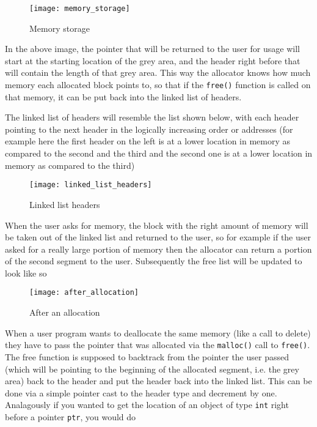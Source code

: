 \documentclass{article}
\begin{document}
\begin{figure}[!htb]
\centering
\texttt{[image: memory\_storage]}
\caption{Memory storage}
\end{figure}

In the above image, the pointer that will be returned to the user for usage
will start at the starting location of the grey area, and the header right
before that will contain the length of that grey area.  This way the allocator
knows how much memory each allocated block points to, so that if the
\texttt{free()} function is called on that memory, it can be put back into the
linked list of headers.

The linked list of headers will resemble the list shown below, with each
header pointing to the next header in the logically increasing order or
addresses (for example here the first header on the left is at a lower
location in memory as compared to the second and the third and the second one
is at a lower location in memory as compared to the third)

\begin{figure}[!htb]
\centering
\texttt{[image: linked\_list\_headers]}
\caption{Linked list headers}
\end{figure}

When the user asks for memory, the block with the right amount of memory will
be taken out of the linked list and returned to the user, so for example if
the user asked for a really large portion of memory then the allocator can
return a portion of the second segment to the user.  Subsequently the free
list will be updated to look like so

\begin{figure}[!htb]
\centering
\texttt{[image: after\_allocation]}
\caption{After an allocation}
\end{figure}

When a user program wants to deallocate the same memory (like a call to
delete) they have to pass the pointer that was allocated via the
\texttt{malloc()} call to \texttt{free()}.  The free function is supposed to
backtrack from the pointer the user passed (which will be pointing to the
beginning of the allocated segment, i.e.  the grey area) back to the header
and put the header back into the linked list.  This can be done via a simple
pointer cast to the header type and decrement by one.  Analagously if you
wanted to get the location of an object of type \texttt{int} right before a
pointer \texttt{ptr}, you would do
\end{document}

